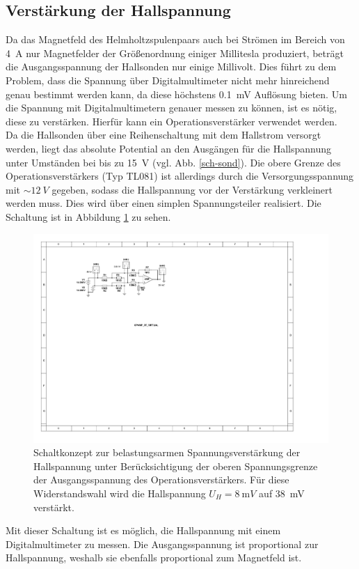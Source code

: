 \documentclass[12pt,a4paper]{article}
\begin{document}
\subsection{Verstärkung der Hallspannung}
Da das Magnetfeld des Helmholtzspulenpaars auch bei Strömen im Bereich von \SI{4}{A} nur Magnetfelder der Größenordnung einiger Millitesla produziert, beträgt die Ausgangsspannung der Hallsonden nur einige Millivolt. Dies führt zu dem Problem, dass die Spannung über Digitalmultimeter nicht mehr hinreichend genau bestimmt werden kann, da diese höchstens \SI{0.1}{\milli V} Auflösung bieten. Um die Spannung mit Digitalmultimetern genauer messen zu können, ist es nötig, diese zu verstärken. Hierfür kann ein Operationsverstärker verwendet werden.\\

Da die Hallsonden über eine Reihenschaltung mit dem Hallstrom versorgt werden, liegt das absolute Potential an den Ausgängen für die Hallspannung unter Umständen bei bis zu \SI{15}{V} (vgl. Abb.  \ref{sch-sond}). Die obere Grenze des Operationsverstärkers (Typ TL081) ist allerdings durch die Versorgungsspannung mit $\sim\SI{12}{V}$ gegeben, sodass die Hallspannung vor der Verstärkung verkleinert werden muss. Dies wird über einen simplen Spannungsteiler realisiert. Die Schaltung ist in Abbildung \ref{fig:schaltung} zu sehen.
\begin{figure}[H]
	\centering
	\includegraphics[scale=1.3]{Schaltung1.pdf}
	\caption{Schaltkonzept zur belastungsarmen Spannungsverstärkung der Hallspannung unter Berücksichtigung der oberen Spannungsgrenze der Ausgangsspannung des Operationsverstärkers. Für diese Widerstandswahl wird die Hallspannung $U_H=\SI{8}{\milli V}$ auf \SI{38}{mV} verstärkt.}
	\label{fig:schaltung}
\end{figure}
\noindent Mit dieser Schaltung ist es möglich, die Hallspannung mit einem Digitalmultimeter zu messen. Die Ausgangsspannung ist proportional zur Hallspannung, weshalb sie ebenfalls proportional zum Magnetfeld ist.\\
\end{document}
